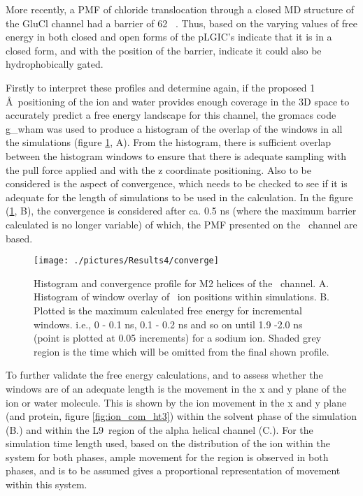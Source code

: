 More recently, a PMF of chloride translocation through a closed MD structure of the GluCl channel had a barrier of 62 \kj\ \cite{Yoluk2015}. Thus, based on the varying values of free energy in both closed and open forms of the pLGIC's indicate that it is in a closed form, and with the position of the barrier, indicate it could also be hydrophobically gated.

Firstly to interpret these profiles and determine again, if the proposed 1 \AA\ positioning of the ion and water provides enough coverage in the 3D space to accurately predict a free energy landscape for this channel, the gromacs code g\_wham \cite{Hub2010a} was used to produce a histogram of the overlap of the windows in all the simulations (figure \ref{fig:converge}, A). From the histogram, there is sufficient overlap between the histogram windows to ensure that there is adequate sampling with the pull force applied and with the z coordinate positioning. Also to be considered is the aspect of convergence, which needs to be checked to see if it is adequate for the length of simulations to be used in the calculation. In the figure (\ref{fig:converge}, B), the  convergence is considered after ca. 0.5 ns (where the maximum barrier calculated is no longer variable) of which, the PMF presented on the \HT\ channel are based.

\begin{figure}[H]
\begin{center}
\texttt{[image: ./pictures/Results4/converge]}
\caption[Histogram and convergence profile for M2 helices of the \HT\ channel.] {Histogram and convergence profile for M2 helices of the \HT\ channel. A. Histogram of window overlay of \Na\ ion positions within simulations. B. Plotted is the maximum calculated free energy for incremental windows. i.e., 0 - 0.1 ns, 0.1 - 0.2 ns and so on until 1.9 -2.0 ns (point is plotted at 0.05 increments) for a sodium ion. Shaded grey region is the time which will be omitted from the final shown profile.}
\label{fig:converge}
\end{center}
\end{figure}

To further validate the free energy calculations, and to assess whether the windows are of an adequate length is the movement in the x and y plane of the ion or water molecule. This is shown by the ion movement in the x and y plane (and protein, figure \ref{fig:ion_com_ht3}) within the solvent phase of the simulation (B.) and within the L9\textquotesingle\ region of the alpha helical channel (C.). For the simulation time length used, based on the distribution of the ion within the system for both phases, ample movement for the region is observed in both phases, and is to be assumed gives a proportional representation of movement within this system. 

